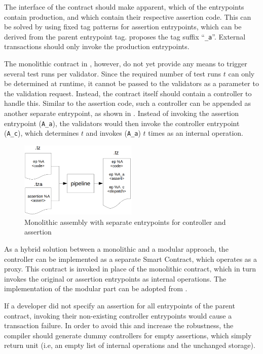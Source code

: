 The interface of the contract should make apparent, which of the entrypoints contain production, and which contain their respective assertion code. This can be solved by using fixed tag patterns for assertion entrypoints, which can be derived from the parent entrypoint tag.  proposes the tag suffix ``\texttt{\_a}''. External transactions should only invoke the production entrypoints.

The monolithic contract in , however, do not yet provide any means to trigger several test runs per validator. Since the required number of test runs $t$ can only be determined at runtime, it cannot be passed to the validators as a parameter to the validation request. Instead, the contract itself should contain a controller to handle this. Similar to the assertion code, such a controller can be appended as another separate entrypoint, as shown in . Instead of invoking the assertion entrypoint (\texttt{A\_a}), the validators would then invoke the controller entrypoint (\texttt{A\_c}), which determines $t$ and invokes (\texttt{A\_a}) $t$ times as an internal operation.
\begin{figure}[h]
\centering
  \includegraphics[width=0.5\textwidth]{figures/5-offline_tezos/pipeline_output_mono_ep}
	\caption{Monolithic assembly with separate entrypoints for controller and assertion}
	\label{fig:monolithic_orchestration}
\end{figure}

As a hybrid solution between a monolithic and a modular approach, the controller can be implemented as a separate Smart Contract, which operates as a proxy. This contract is invoked in place of the monolithic contract, which in turn invokes the original or assertion entrypoints as internal operations. The implementation of the modular part can be adopted from .

If a developer did not specify an assertion for all entrypoints of the parent contract, invoking their non-existing controller entrypoints would cause a transaction failure. In order to avoid this and increase the robustness, the compiler should generate dummy controllers for empty assertions, which simply return unit (i.e, an empty list of internal operations and the unchanged storage).

